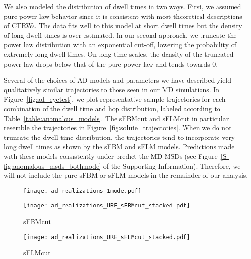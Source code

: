 \documentclass[journal=ancac3,manuscript=article,layout=twocolumn]{achemso}
\begin{document}
  We also modeled the distribution of dwell times in two ways. First, we
  assumed pure power law behavior since it is consistent with most theoretical
  descriptions of CTRWs. The data fits well to this model at short dwell times
  but the density of long dwell times is over-estimated. In our second
  approach, we truncate the power law distribution with an exponential cut-off,
  lowering the probability of extremely long dwell times. 
  On long time scales, the density of the truncated power law drops below that
  of the pure power law and tends towards 0. %
  
  Several of the choices of AD models and parameters we have described yield
  qualitatively similar trajectories to those seen in our MD simulations.  In
  Figure~\ref{fig:ad_eyetest}, we plot representative sample trajectories for
  each combination of the dwell time and hop distribution, labeled according to
  Table~\ref{table:anomalous_models}. The sFBMcut and sFLMcut in particular
  resemble the trajectories in Figure~\ref{fig:solute_trajectories}.  When we
  do not truncate the dwell time distribution, the trajectories tend to
  incorporate very long dwell times as shown by the sFBM and sFLM models.
  Predictions made with these models consistently under-predict the MD MSDs
  (see Figure~\ref{S-fig:anomalous_msds_bothmode} of the Supporting Information).
  Therefore, we will not include the pure sFBM or sFLM models in the
  remainder of our analysis.   
  
  \begin{figure*}
  \centering
  \begin{subfigure}{0.325\textwidth}
  \texttt{[image: ad\_realizations\_1mode.pdf]}
  \caption{}\label{fig:ad_realizations_1mode}
  \end{subfigure}
  \begin{subfigure}{0.325\textwidth}
  \texttt{[image: ad\_realizations\_URE\_sFBMcut\_stacked.pdf]}
  \caption{sFBMcut}\label{fig:ad_realizations_sFBMcut_stacked}
  \end{subfigure}
  \begin{subfigure}{0.325\textwidth}
  \texttt{[image: ad\_realizations\_URE\_sFLMcut\_stacked.pdf]}
  \caption{sFLMcut}\label{fig:ad_realizations_sFLMcut_stacked}
  \end{subfigure}
  \caption{(a) Simulated urea trajectories generated by each of the four
	  variations of the one mode AD model display qualitatively similar
	  hopping and trapping behavior to that shown in
	  Figure~\ref{fig:solute_trajectories}. Dwell times are exaggerated in
	  the sFBM and sFLM models because the power law dwell time
	  distributions are not truncated and have infinite variance. In (b)
	  and (c) we compare additional trajectories simulated with the sFBMcut
	  and sFLMcut models (blue) to MD solute trajectories (black).
	  Trajectories are vertically offset for visual clarity.
  }\label{fig:ad_eyetest}
  \end{figure*}
    
\end{document}
